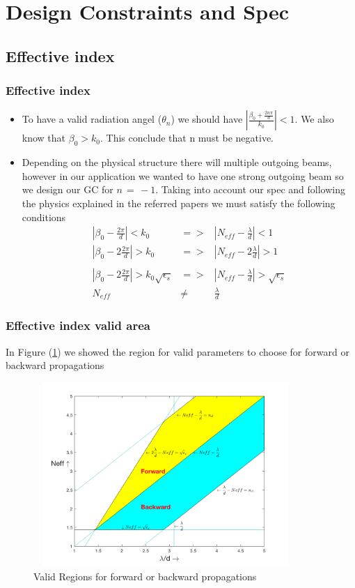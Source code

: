 \documentclass{beamer}
\begin{document}
\section{Design Constraints and Spec} 
\begin{frame}
\subsection{Effective index} 
\frametitle{Effective index}
\begin{itemize}
\item  To have a valid radiation angel ($\theta_n$) we should have $|\frac{\beta_0 +\frac{2n\pi}{d}}{k_0}| <1$. We also know that $\beta_0 > k_0$. This conclude that n must be negative.
\item Depending on the physical structure there will multiple outgoing beams, however in our application we wanted to have one strong outgoing beam so we design our GC for $n \, = \, -1$.  Taking into account our spec and following the physics explained in the referred papers  we must satisfy the following conditions
\begin{eqnarray*}
|\beta_0 -\frac{2\pi}{d}| <k_0 & => & |N_{eff}-\frac{\lambda}{d}| < 1\\
|\beta_0 -2\frac{2\pi}{d}| >k_0 & => & |N_{eff}-2\frac{\lambda}{d}| > 1\\ \\
|\beta_0 -2\frac{2\pi}{d}| >k_0 \sqrt{\epsilon_s} & => & |N_{eff}-\frac{\lambda}{d}| > \sqrt{\epsilon_s} \\
N_{eff} & \neq & \frac{\lambda}{d} 
\end{eqnarray*}
\end{itemize}
\end{frame}
%
\begin{frame}
\frametitle{Effective index valid area}
In Figure (\ref{neff1}) we showed the region for valid parameters to choose for forward or backward propagations
\begin{figure}[H]
\begin{center}
\includegraphics[width=10cm, height=7cm]{Figures/neffConstraint}
\caption{Valid Regions for forward or backward propagations}
\label{neff1}
\end{center}
\end{figure}
\end{frame}
%
\end{document}
